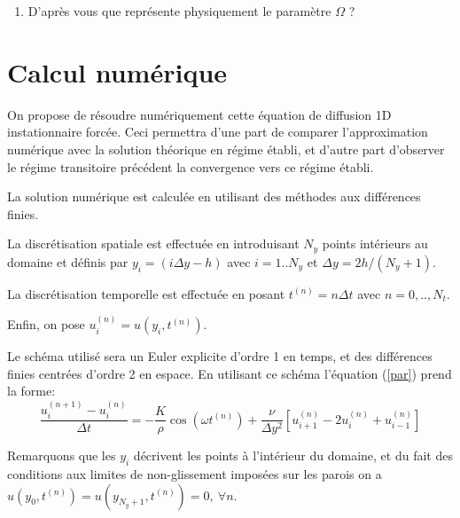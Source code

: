 \documentclass[a4,12pt]{article}
\begin{document}
\begin{enumerate}
On fournit un programme \textsc{Matlab} \texttt{pulse.m} qui permet de visualiser
cette solution théorique. A l'aide de ce programme visualiser les profils de vitesse pour différentes valeurs de $\Omega$ prises dans l'intervalle $10^{-3} \leq \Omega <10^3$.

Repr\'esenter sch\'ematiquement sur votre compte-rendu la forme du profil de vitesse
à différents instants du cycle, dans les deux r\'egimes asymptotiques des grands et petits $\Omega$.
Commentez physiquement les résultats.

\item  D'apr\`es vous que repr\'esente physiquement le param\`etre $\Omega$ ? 


\end{enumerate}

\section{Calcul num\'erique}
On propose de r\'esoudre num\'eriquement cette \'equation de diffusion 
1D instationnaire forc\'ee.
Ceci permettra d'une part de comparer l'approximation numérique avec
la solution théorique en régime établi, et d'autre part d'observer
le régime transitoire précédent la convergence vers ce régime établi.

 La solution num\'erique est calcul\'ee en utilisant des m\'ethodes aux diff\'erences finies.


La discrétisation spatiale est effectuée en introduisant $N_y$ points intérieurs au domaine et définis
par $y_i = (i \Delta y -h)$ avec $i=1..N_y$ et $\Delta y = 2 h /(N_y+1)$.

La discrétisation temporelle est effectuée en posant  $t^{(n)}=n\Delta t$ avec $n=0,..,N_t$.

Enfin, on pose $u_i^{(n)} = u(y_i,t^{(n)})$.

Le sch\'ema utilis\'e sera un Euler explicite d'ordre 1 en temps, et des diff\'erences finies centr\'ees d'ordre 2 en espace.
En utilisant ce schéma l'\'equation (\ref{par}) prend la forme:
\begin{equation}
\label{disc}
\frac{u_i^{(n+1)}-u_i^{(n)}}{\Delta t}=-\frac{K}{\rho} \cos( \omega t^{(n)} ) + \frac{\nu}{\Delta y^2} 
\left[ u_{i+1}^{(n)}-2u_i^{(n)}+u_{i-1}^{(n)} \right] 
\end{equation}
\noindent


Remarquons que les $y_i$ d\'ecrivent les points \`a l'int\'erieur du domaine, et du fait des conditions aux limites 
de non-glissement impos\'ees sur les parois on a $u(y_0,t^{(n)})=u(y_{N_y+1},t^{(n)})=0, \ \forall n$.
\end{document}
